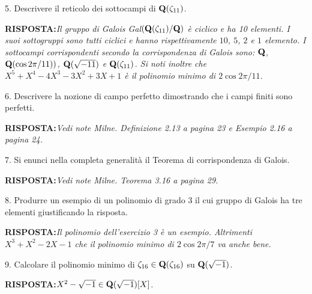 \item{5.} Descrivere il reticolo dei sottocampi di ${\bf Q}(\zeta_{11})$.
\smallskip
\item{\bf RISPOSTA:}\it Il gruppo di Galois Gal$({\bf Q}(\zeta_{11})/{\bf Q})$ \`{e} ciclico e ha 10 elementi.
I suoi sottogruppi sono tutti ciclici e hanno rispettivamente $10$, $5$, $2$ e $1$ elemento. I sottocampi
corrispondenti secondo la corrispondenza di Galois sono: ${\bf Q}$, ${\bf Q}(\cos2\pi/11))$, ${\bf Q}(\sqrt{-11})$
e ${\bf Q}(\zeta_{11})$. Si noti inoltre che $X^5+X^4-4X^3-3X^2+3X+1$ \`{e} il polinomio minimo di $2\cos2\pi/11$.\rm\bigskip

\item{6.} Descrivere la nozione di campo perfetto dimostrando che i campi finiti
sono perfetti.
\smallskip
\item{\bf RISPOSTA:}\it Vedi note Milne. Definizione 2.13 a pagina 23 e Esempio 2.16 a pagina 24.\rm\bigskip

\item{7.} Si enunci nella completa generalit\`a il Teorema di
corrispondenza di Galois.
\smallskip
\item{\bf RISPOSTA:}\it Vedi note Milne. Teorema 3.16 a pagina 29.\rm\bigskip

\item{8.} Produrre un esempio di un polinomio di grado $3$ il cui gruppo di Galois ha tre elementi giustificando la risposta.
\smallskip
\item{\bf RISPOSTA:}\it Il polinomio dell'esercizio 3 \`{e} un esempio. Altrimenti $X^3+X^2-2X-1$ che il polinomio minimo di $2\cos2\pi/7$ va anche bene.\rm\bigskip

\item{9.} Calcolare il polinomio minimo di $\zeta_{16}\in{\bf Q}(\zeta_{16})$ su ${\bf Q}(\sqrt{-1})$.
\smallskip
\item{\bf RISPOSTA:}\it $X^2-\sqrt{-1}\in{\bf Q}(\sqrt{-1})[X]$.\rm
\bye
